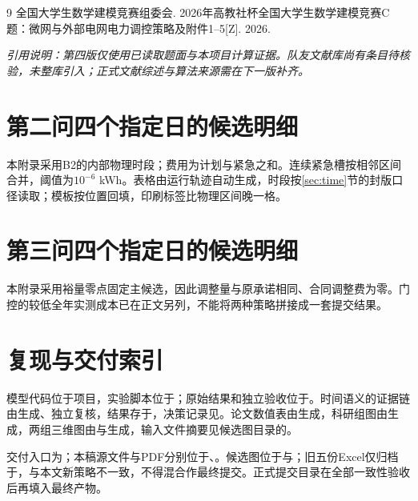 \documentclass[UTF8,a4paper,zihao=-4,fontset=fandol]{ctexart}
\begin{document}
\begin{thebibliography}{9}
 全国大学生数学建模竞赛组委会. 2026年高教社杯全国大学生数学建模竞赛C题：微网与外部电网电力调控策略及附件1--5[Z]. 2026.
\end{thebibliography}
\noindent\textit{引用说明：第四版仅使用已读取题面与本项目计算证据。队友文献库尚有条目待核验，未整库引入；正式文献综述与算法来源需在下一版补齐。}

\appendix
\section{第二问四个指定日的候选明细}
本附录采用B2的内部物理时段；费用为计划与紧急之和。连续紧急槽按相邻区间合并，阈值为$10^{-6}$ kWh。表格由运行轨迹自动生成，时段按\ref{sec:time}节的封版口径读取；模板按位置回填，印刷标签比物理区间晚一格。

\section{第三问四个指定日的候选明细}
本附录采用裕量零点固定主候选，因此调整量与原承诺相同、合同调整费为零。门控的较低全年实测成本已在正文另列，不能将两种策略拼接成一套提交结果。

\section{复现与交付索引}
模型代码位于项目，实验脚本位于；原始结果和独立验收位于。时间语义的证据链由生成、独立复核，结果存于，决策记录见。论文数值表由生成，科研组图由生成，两组三维图由与生成，输入文件摘要见候选图目录的。

交付入口为；本稿源文件与PDF分别位于、。候选图位于与；旧五份Excel仅归档于，与本文新策略不一致，不得混合作最终提交。正式提交目录在全部一致性验收后再填入最终产物。
\end{document}
